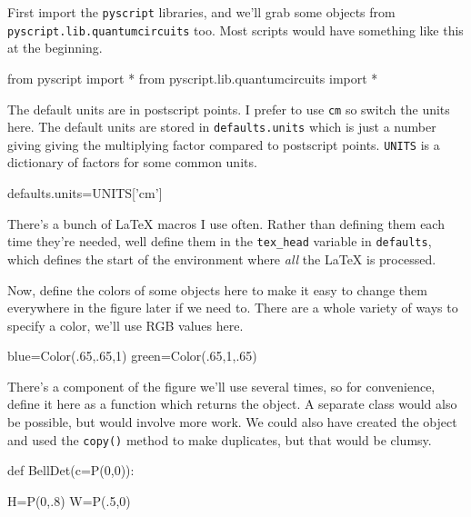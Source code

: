 \documentclass[a4paper]{book}
\begin{document}
First import the \Verb|pyscript| libraries, and we'll grab some objects
from \Verb|pyscript.lib.quantumcircuits| too. Most scripts would have
something like this at the beginning.
\begin{python}
from pyscript import *
from pyscript.lib.quantumcircuits import *
\end{python}
The default units are in postscript points. I prefer to use
\texttt{cm} so switch the units here. The default units are stored in
\Verb|defaults.units| which is just a number giving giving the
multiplying factor compared to postscript points. \Verb|UNITS| is a
dictionary of factors for some common units.
\begin{python}
defaults.units=UNITS['cm']
\end{python}
There's a bunch of \LaTeX{} macros I use often. Rather than defining
them each time they're needed, well define them in the \Verb|tex_head|
variable in \Verb|defaults|, which defines the start of the
environment where \emph{all} the \LaTeX{} is processed.
Now, define the colors of some objects here to make it easy to change
them everywhere in the figure later if we need to. There are a whole
variety of ways to specify a color, we'll use RGB values here.
\begin{python}
blue=Color(.65,.65,1)
green=Color(.65,1,.65)
\end{python}
There's a component of the figure we'll use several times, so for
convenience, define it here as a function which returns the object. 
A separate class would also be possible, but would involve more work.
We could also have created the object and used the \Verb|copy()| method
to make duplicates, but that would be clumsy.
\begin{python}
def BellDet(c=P(0,0)):

    H=P(0,.8)
    W=P(.5,0)
\end{python}
\end{document}
